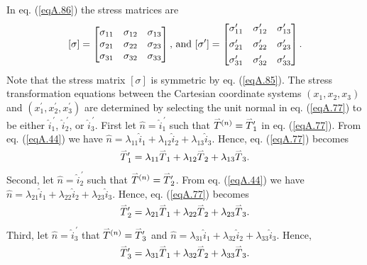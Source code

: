 \documentclass{AeroStructure-ERJohnson}
\def\harp#1{\smash{\mathord{\buildrel{\lower3pt\hbox{$\scriptscriptstyle\rightharpoonup$}}\over{#1}}}}
\begin{document}
In eq. (\ref{eqA.86}) the stress matrices are
\begin{align}\label{eqA.87}
[\sigma]=\left[\begin{array}{@{}lll@{}}\sigma_{11} & \sigma_{12} & \sigma_{13} \\\sigma_{21} & \sigma_{22} & \sigma_{23} \\\sigma_{31} & \sigma_{32} & \sigma_{33}\end{array}\right]\mbox{, and }[\sigma^{\prime}]=\left[\begin{array}{@{}lll@{}}\sigma_{11}^{\prime} & \sigma_{12}^{\prime} & \sigma_{13}^{\prime} \\[4pt]\sigma_{21}^{\prime} & \sigma_{22}^{\prime} & \sigma_{23}^{\prime} \\[4pt]\sigma_{31}^{\prime} & \sigma_{32}^{\prime} & \sigma_{33}^{\prime}\end{array}\right].
\end{align}
Note that the stress matrix $[\sigma]$ is symmetric by eq. (\ref{eqA.85}). The stress transformation equations between the Cartesian coordinate systems $(x_{1}, x_{2}, x_{3})$ and $(x_{1}^{\prime}, x_{2}^{\prime}, x_{3}^{\prime})$ are determined by selecting the unit normal in eq. (\ref{eqA.77}) to be either $\hat{i}_1^{\,\prime}$, $\hat{i}_2^{\,\prime}$, or $\hat{i}_{3}^{\,\prime}$. First let $\hat{n}=\hat{i}_{1}^{\,\prime}$ such that $\harp{T}^{(n)}=\harp{T}_{1}^{\prime}$ in eq. (\ref{eqA.77}). From eq. (\ref{eqA.44}) we have $\hat{n}=\lambda_{11} \hat{i}_{1}+\lambda_{12} \hat{i}_{2}+\lambda_{13} \hat{i}_{3}$. Hence, eq. (\ref{eqA.77}) becomes
\begin{align}\label{eqA.88}
\harp{T}_{1}^{\prime}=\lambda_{11} \harp{T}_{1}+\lambda_{12} \harp{T}_{2}+\lambda_{13} \harp{T}_{3}.
\end{align}
Second, let $\hat{n}=\hat{i}_{2}^{\,\prime}$ such that $\harp{T}^{(n)}=\harp{T}_{2}^{\prime}$. From eq. (\ref{eqA.44}) we have $\hat{n}=\lambda_{21} \hat{i}_{1}+\lambda_{22} \hat{i}_{2}+\lambda_{23} \hat{i}_{3}$. Hence, eq. (\ref{eqA.77}) becomes
\begin{align}\label{eqA.89}
\harp{T}_{2}^{\prime}=\lambda_{21} \harp{T}_{1}+\lambda_{22} \harp{T}_{2}+\lambda_{23} \harp{T}_{3}.
\end{align}
Third, let $\hat{n}=\hat{i}_{3}^{\,\prime}$ that $\harp{T}^{(n)}=\harp{T}_{3}^{\prime}$ and $\hat{n}=\lambda_{31} \hat{i}_{1}+\lambda_{32} \hat{i}_{2}+\lambda_{33} \hat{i}_{3}$. Hence,
\begin{align}\label{eqA.90}
\harp{T}_{3}^{\prime}=\lambda_{31} \harp{T}_{1}+\lambda_{32} \harp{T}_{2}+\lambda_{33} \harp{T}_{3}.
\end{align}
\end{document}
